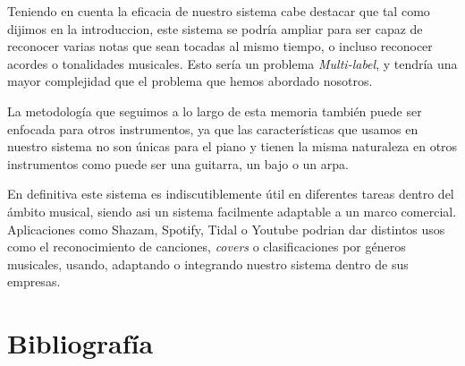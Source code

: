 \documentclass[12pt]{article}
\begin{document}
\bigskip
Teniendo en cuenta la eficacia de nuestro sistema cabe destacar que tal como dijimos en la introduccion, este sistema se podría ampliar para ser capaz de
reconocer varias notas que sean tocadas al mismo tiempo, o incluso reconocer acordes o tonalidades musicales. Esto sería un problema
\textit{Multi-label}, y tendría una mayor complejidad que el problema que hemos abordado nosotros.

\bigskip
La metodología que seguimos a lo largo de esta memoria también puede ser enfocada para otros instrumentos, ya que las características que usamos en nuestro sistema
no son únicas para el piano y tienen la misma naturaleza en otros instrumentos como puede ser una guitarra, un bajo o un arpa.

\bigskip
En definitiva este sistema es indiscutiblemente útil en diferentes tareas dentro del ámbito musical, siendo asi un sistema facilmente adaptable a un marco comercial. 
Aplicaciones como Shazam, Spotify, Tidal o Youtube podrian dar distintos usos como el reconocimiento de canciones, \textit{covers} o clasificaciones por géneros musicales,
usando, adaptando o integrando nuestro sistema dentro de sus empresas.


\newpage

\section{Bibliografía}
\label{Bibliografía}
\printbibliography
\end{document}
